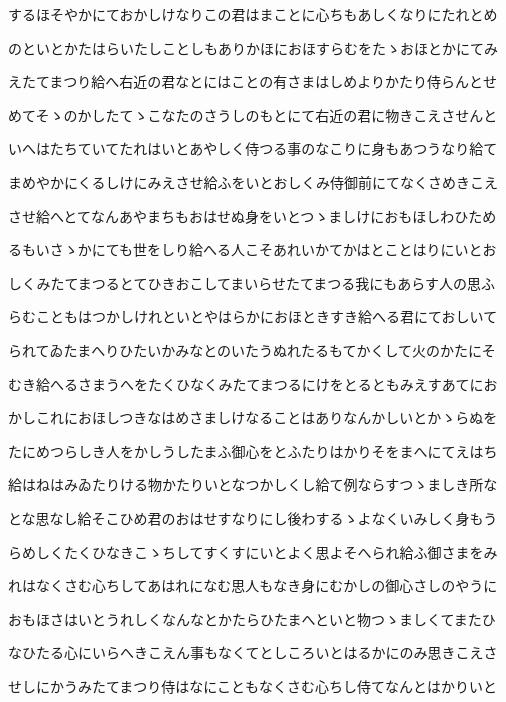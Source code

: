 \documentclass[a4paper,11pt,landscape]{ltjtarticle}
\begin{document}
するほそやかにておかしけなりこの君はまことに心ちもあしくなりにたれとめ
\par\medskip
のといとかたはらいたしことしもありかほにおほすらむをたゝおほとかにてみ
\par\medskip
えたてまつり給へ右近の君なとにはことの有さまはしめよりかたり侍らんとせ
\par\medskip
めてそゝのかしたてゝこなたのさうしのもとにて右近の君に物きこえさせんと
\par\medskip
いへはたちていてたれはいとあやしく侍つる事のなこりに身もあつうなり給て
\par\medskip
まめやかにくるしけにみえさせ給ふをいとおしくみ侍御前にてなくさめきこえ
\par\medskip
させ給へとてなんあやまちもおはせぬ身をいとつゝましけにおもほしわひため
\par\medskip
るもいさゝかにても世をしり給へる人こそあれいかてかはとことはりにいとお
\par\medskip
しくみたてまつるとてひきおこしてまいらせたてまつる我にもあらす人の思ふ
\par\medskip
らむこともはつかしけれといとやはらかにおほときすき給へる君にておしいて
\par\medskip
られてゐたまへりひたいかみなとのいたうぬれたるもてかくして火のかたにそ
\par\medskip
むき給へるさまうへをたくひなくみたてまつるにけをとるともみえすあてにお
\par\medskip
かしこれにおほしつきなはめさましけなることはありなんかしいとかゝらぬを
\par\medskip
たにめつらしき人をかしうしたまふ御心をとふたりはかりそをまへにてえはち
\par\medskip
給はねはみゐたりける物かたりいとなつかしくし給て例ならすつゝましき所な
\par\medskip
とな思なし給そこひめ君のおはせすなりにし後わするゝよなくいみしく身もう
\par\medskip
らめしくたくひなきこゝちしてすくすにいとよく思よそへられ給ふ御さまをみ
\par\medskip
れはなくさむ心ちしてあはれになむ思人もなき身にむかしの御心さしのやうに
\par\medskip
おもほさはいとうれしくなんなとかたらひたまへといと物つゝましくてまたひ
\par\medskip
なひたる心にいらへきこえん事もなくてとしころいとはるかにのみ思きこえさ
\par\medskip
せしにかうみたてまつり侍はなにこともなくさむ心ちし侍てなんとはかりいと
\par\medskip
\end{document}

